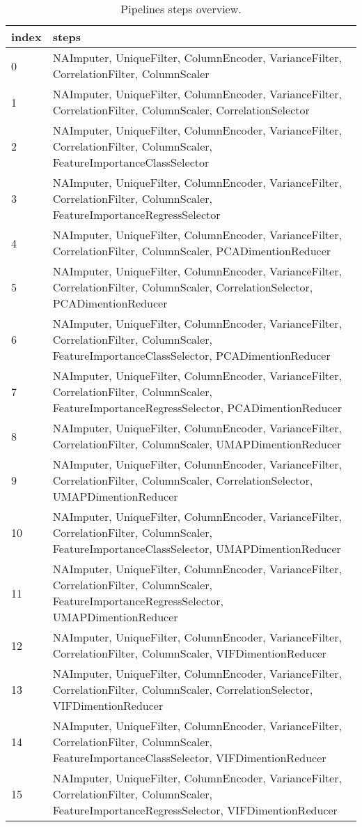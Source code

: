 \documentclass{article}%
\begin{document}
\begin{table}[H]%
\begin{center}%
\renewcommand{\arraystretch}{1.5}%
\begin{tabular}{p{20mm} p{160mm}}%
\hline%
\textbf{index}&\textbf{steps}\\%
\hline%
0&NAImputer, UniqueFilter, ColumnEncoder, VarianceFilter, CorrelationFilter, ColumnScaler\\%
1&NAImputer, UniqueFilter, ColumnEncoder, VarianceFilter, CorrelationFilter, ColumnScaler, CorrelationSelector\\%
2&NAImputer, UniqueFilter, ColumnEncoder, VarianceFilter, CorrelationFilter, ColumnScaler, FeatureImportanceClassSelector\\%
3&NAImputer, UniqueFilter, ColumnEncoder, VarianceFilter, CorrelationFilter, ColumnScaler, FeatureImportanceRegressSelector\\%
4&NAImputer, UniqueFilter, ColumnEncoder, VarianceFilter, CorrelationFilter, ColumnScaler, PCADimentionReducer\\%
5&NAImputer, UniqueFilter, ColumnEncoder, VarianceFilter, CorrelationFilter, ColumnScaler, CorrelationSelector, PCADimentionReducer\\%
6&NAImputer, UniqueFilter, ColumnEncoder, VarianceFilter, CorrelationFilter, ColumnScaler, FeatureImportanceClassSelector, PCADimentionReducer\\%
7&NAImputer, UniqueFilter, ColumnEncoder, VarianceFilter, CorrelationFilter, ColumnScaler, FeatureImportanceRegressSelector, PCADimentionReducer\\%
8&NAImputer, UniqueFilter, ColumnEncoder, VarianceFilter, CorrelationFilter, ColumnScaler, UMAPDimentionReducer\\%
9&NAImputer, UniqueFilter, ColumnEncoder, VarianceFilter, CorrelationFilter, ColumnScaler, CorrelationSelector, UMAPDimentionReducer\\%
10&NAImputer, UniqueFilter, ColumnEncoder, VarianceFilter, CorrelationFilter, ColumnScaler, FeatureImportanceClassSelector, UMAPDimentionReducer\\%
11&NAImputer, UniqueFilter, ColumnEncoder, VarianceFilter, CorrelationFilter, ColumnScaler, FeatureImportanceRegressSelector, UMAPDimentionReducer\\%
12&NAImputer, UniqueFilter, ColumnEncoder, VarianceFilter, CorrelationFilter, ColumnScaler, VIFDimentionReducer\\%
13&NAImputer, UniqueFilter, ColumnEncoder, VarianceFilter, CorrelationFilter, ColumnScaler, CorrelationSelector, VIFDimentionReducer\\%
14&NAImputer, UniqueFilter, ColumnEncoder, VarianceFilter, CorrelationFilter, ColumnScaler, FeatureImportanceClassSelector, VIFDimentionReducer\\%
15&NAImputer, UniqueFilter, ColumnEncoder, VarianceFilter, CorrelationFilter, ColumnScaler, FeatureImportanceRegressSelector, VIFDimentionReducer\\%
\hline%
\end{tabular}%
\end{center}%
\caption{Pipelines steps overview.}%
\label{tab:pipelines_steps_overview}%
\end{table}
\end{document}
